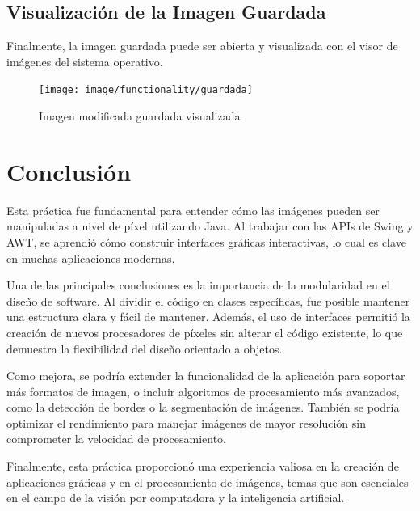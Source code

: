 \documentclass{report}
\begin{document}
  \section{Visualización de la Imagen Guardada}\label{sec:visualizacion-de-la-imagen-guardada}
  Finalmente, la imagen guardada puede ser abierta y visualizada con el visor de imágenes del sistema operativo.

  \begin{figure}[H]
    \centering
    \texttt{[image: image/functionality/guardada]}
    \caption{Imagen modificada guardada visualizada}\label{fig:guardada}
  \end{figure}


  \chapter{Conclusión}\label{ch:conclusion}
  Esta práctica fue fundamental para entender cómo las imágenes pueden ser manipuladas a nivel de píxel utilizando Java.
  Al trabajar con las APIs de Swing y AWT, se aprendió cómo construir interfaces gráficas interactivas, lo cual es clave en muchas aplicaciones modernas.

  Una de las principales conclusiones es la importancia de la modularidad en el diseño de software.
  Al dividir el código en clases específicas, fue posible mantener una estructura clara y fácil de mantener.
  Además, el uso de interfaces permitió la creación de nuevos procesadores de píxeles sin alterar el código existente, lo que demuestra la flexibilidad del diseño orientado a objetos.

  Como mejora, se podría extender la funcionalidad de la aplicación para soportar más formatos de imagen, o incluir algoritmos de procesamiento más avanzados, como la detección de bordes o la segmentación de imágenes.
  También se podría optimizar el rendimiento para manejar imágenes de mayor resolución sin comprometer la velocidad de procesamiento.

  Finalmente, esta práctica proporcionó una experiencia valiosa en la creación de aplicaciones gráficas y en el procesamiento de imágenes, temas que son esenciales en el campo de la visión por computadora y la inteligencia artificial.
\end{document}
